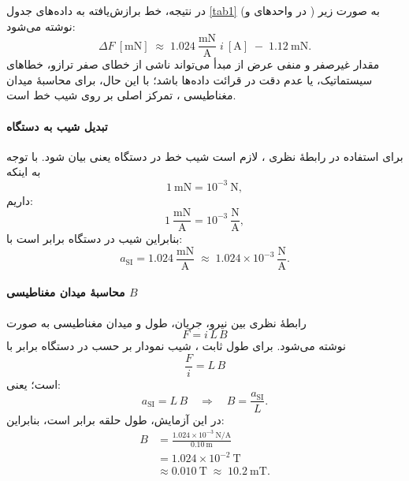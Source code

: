 \documentclass[a4paper, 11pt]{article}
\begin{document}
در نتیجه، خط برازش‌یافته به داده‌های جدول \ref{tab1} (در واحدهای  و ) به صورت زیر نوشته می‌شود:
\begin{equation}
\Delta F~[\mathrm{mN}] \;\approx\; 1.024~\frac{\mathrm{mN}}{\mathrm{A}}\; i~[\mathrm{A}] \;-\; 1.12~\mathrm{mN}.
\end{equation}
مقدار غیرصفر و منفی عرض از مبدأ می‌تواند ناشی از خطای صفر ترازو، خطاهای سیستماتیک، یا عدم دقت در قرائت داده‌ها باشد؛ با این حال، برای محاسبهٔ میدان مغناطیسی ، تمرکز اصلی بر روی شیب خط است.

\paragraph{تبدیل شیب به دستگاه }
برای استفاده در رابطهٔ نظری ، لازم است شیب خط در دستگاه  یعنی  بیان شود. با توجه به اینکه
\[
1~\mathrm{mN} = 10^{-3}~\mathrm{N},
\]
داریم:
\begin{equation}
1~\frac{\mathrm{mN}}{\mathrm{A}} = 10^{-3}~\frac{\mathrm{N}}{\mathrm{A}},
\end{equation}
بنابراین شیب در دستگاه  برابر است با:
\begin{equation}
a_{\mathrm{SI}} = 1.024~\frac{\mathrm{mN}}{\mathrm{A}}
\;\approx\; 1.024\times 10^{-3}~\frac{\mathrm{N}}{\mathrm{A}}.
\end{equation}

\paragraph{محاسبهٔ میدان مغناطیسی \texorpdfstring{$B$}{B}}
رابطهٔ نظری بین نیرو، جریان، طول و میدان مغناطیسی به صورت
\begin{equation}
F = i\,L\,B
\end{equation}
نوشته می‌شود. برای طول ثابت ، شیب نمودار  بر حسب  در دستگاه  برابر با
\begin{equation}
\frac{F}{i} = L\,B
\end{equation}
است؛ یعنی:
\begin{equation}
a_{\mathrm{SI}} = L\,B \quad\Rightarrow\quad B = \frac{a_{\mathrm{SI}}}{L}.
\end{equation}
در این آزمایش، طول حلقه برابر  است، بنابراین:
\begin{align}
B &= \frac{1.024\times 10^{-3}~\mathrm{N/A}}{0.10~\mathrm{m}} \nonumber\\
  &= 1.024\times 10^{-2}~\mathrm{T} \nonumber\\
  &\approx 0.010~\mathrm{T} \;\approx\; 10.2~\mathrm{mT}.
\end{align}
\end{document}
